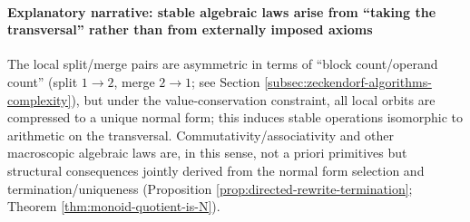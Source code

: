 \paragraph{Explanatory narrative: stable algebraic laws arise from ``taking the transversal'' rather than from externally imposed axioms}
The local split/merge pairs are asymmetric in terms of ``block count/operand count'' (split \(1\to 2\), merge \(2\to 1\); see Section \ref{subsec:zeckendorf-algorithms-complexity}), but under the value-conservation constraint, all local orbits are compressed to a unique normal form; this induces stable operations isomorphic to arithmetic on the transversal. Commutativity/associativity and other macroscopic algebraic laws are, in this sense, not a priori primitives but structural consequences jointly derived from the normal form selection and termination/uniqueness (Proposition \ref{prop:directed-rewrite-termination}; Theorem \ref{thm:monoid-quotient-is-N}).


